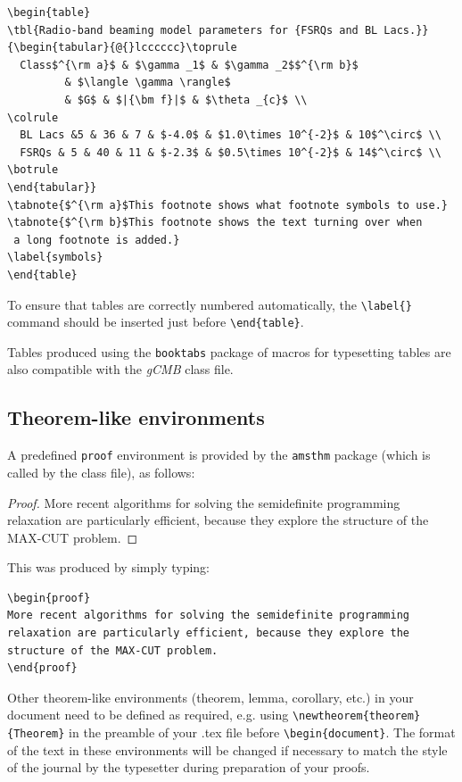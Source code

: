 \documentclass{gCMB2e}
\begin{document}
\begin{verbatim}
\begin{table}
\tbl{Radio-band beaming model parameters for {FSRQs and BL Lacs.}}
{\begin{tabular}{@{}lcccccc}\toprule
  Class$^{\rm a}$ & $\gamma _1$ & $\gamma _2$$^{\rm b}$
         & $\langle \gamma \rangle$
         & $G$ & $|{\bm f}|$ & $\theta _{c}$ \\
\colrule
  BL Lacs &5 & 36 & 7 & $-4.0$ & $1.0\times 10^{-2}$ & 10$^\circ$ \\
  FSRQs & 5 & 40 & 11 & $-2.3$ & $0.5\times 10^{-2}$ & 14$^\circ$ \\
\botrule
\end{tabular}}
\tabnote{$^{\rm a}$This footnote shows what footnote symbols to use.}
\tabnote{$^{\rm b}$This footnote shows the text turning over when
 a long footnote is added.}
\label{symbols}
\end{table}
\end{verbatim}

To ensure that tables are correctly numbered automatically, the
\verb"\label{}" command should be inserted just before
\verb"\end{table}".

Tables produced using the {\tt booktabs} package of macros for typesetting tables are also compatible with the {\it gCMB} class file.


\subsection{Theorem-like environments}

A predefined \verb"proof" environment is provided by the {\tt amsthm} package (which is called by the class file), as follows:

\begin{proof}
More recent algorithms for solving the semidefinite programming
relaxation are particularly efficient, because they explore the
structure of the MAX-CUT problem.
\end{proof}
\noindent This was produced by simply typing:

\begin{verbatim}
\begin{proof}
More recent algorithms for solving the semidefinite programming
relaxation are particularly efficient, because they explore the
structure of the MAX-CUT problem.
\end{proof}
\end{verbatim}
%
Other theorem-like environments (theorem, lemma, corollary, etc.) in your document need to be defined as required, e.g. using \verb"\newtheorem{theorem}{Theorem}" in the preamble of your .tex file before \verb"\begin{document}". The format of the text in these environments will be changed if necessary to match the style of the journal by the typesetter during preparation of your proofs.
\end{document}
